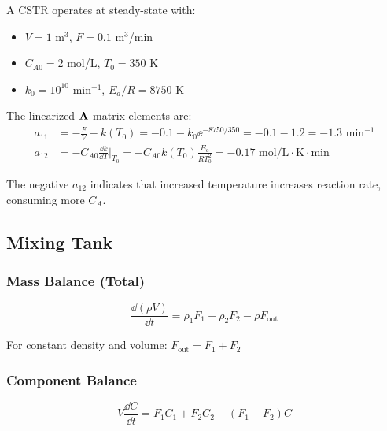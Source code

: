 \begin{examplebox}[title=Example 1.12: CSTR Linearization]
A CSTR operates at steady-state with:
\begin{itemize}
    \item $V = 1$ m$^3$, $F = 0.1$ m$^3$/min
    \item $C_{A0} = 2$ mol/L, $T_0 = 350$ K
    \item $k_0 = 10^{10}$ min$^{-1}$, $E_a/R = 8750$ K
\end{itemize}

The linearized $\mathbf{A}$ matrix elements are:
\begin{align}
a_{11} &= -\frac{F}{V} - k(T_0) = -0.1 - k_0\ee^{-8750/350} = -0.1 - 1.2 = -1.3 \text{ min}^{-1} \\
a_{12} &= -C_{A0}\frac{\dd k}{\dd T}\bigg|_{T_0} = -C_{A0}k(T_0)\frac{E_a}{RT_0^2} = -0.17 \text{ mol/L$\cdot$K$\cdot$min}
\end{align}

The negative $a_{12}$ indicates that increased temperature increases reaction rate, consuming more $C_A$.
\end{examplebox}

\subsection{Mixing Tank}
\label{subsec:mixing}



\subsubsection{Mass Balance (Total)}

\begin{equation}
\frac{\dd(\rho V)}{\dd t} = \rho_1 F_1 + \rho_2 F_2 - \rho F_{\text{out}}
\end{equation}

For constant density and volume: $F_{\text{out}} = F_1 + F_2$

\subsubsection{Component Balance}

\begin{equation}
V\frac{\dd C}{\dd t} = F_1 C_1 + F_2 C_2 - (F_1 + F_2)C
\end{equation}

